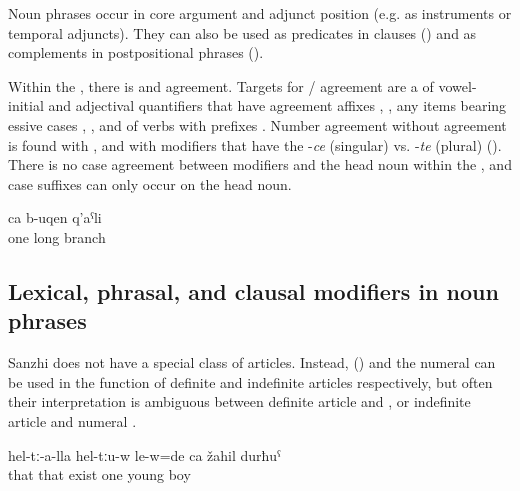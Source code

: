Noun phrases occur in core argument and adjunct position (e.g. as instruments or temporal adjuncts). They can also be used as predicates in  clauses () and as complements in postpositional phrases ().

Within the , there is  and  agreement. Targets for \slash {} agreement are a  of vowel-initial   and adjectival quantifiers that have agreement affixes , , any items bearing essive cases , , and  of verbs with  prefixes . Number agreement without  agreement is found with  , and with modifiers that have the  -\textit{ce} (singular)  vs. -\textit{te} (plural)  (). There is no case agreement between modifiers and the head noun within the , and case suffixes can only occur on the head noun.
%
\begin{exe}
	\ex	\label{ex:a/one long branch@1}
	\gll	ca	b-uqen	q'aˁli\\
		one	long	branch\\
	\glt	{}
\end{exe}



\subsection{Lexical, phrasal, and clausal modifiers in noun phrases}
\label{ssec:Lexical, phrasal, and clausal modifiers in noun phrases}

Sanzhi does not have a special class of articles. Instead,  () and the numeral   can be used in the function of definite and indefinite articles respectively, but often their interpretation is ambiguous between definite article and , or indefinite article and numeral .
%
\begin{exe}
	\ex	\label{ex:There with them was also a / one young boy@2}
	\gll	hel-tː-a-lla	hel-tːu-w	le-w=de	ca	žahil	durħuˁ\\
		that	that	exist	one	young	boy\\
	\glt	{} 
\end{exe}

